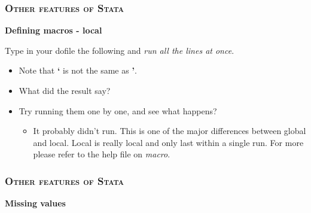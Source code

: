 \documentclass[10pt]{beamer}
\begin{document}
	\begin{frame}
	\frametitle{\textsc{Other features of Stata}}
		\begin{center}
			 \LARGE \textbf{Defining macros - local}
		\end{center}
		Type in your dofile the following and \textit{run all the lines at once}.
		\begin{itemize}
			\item Note that \textbf{`} is not the same as \textbf{'}.
\begin{stlog}\end{stlog}
		\vspace{2mm}
		 \item What did the result say?
		\onslide<3-> 
\begin{stlog}\end{stlog}
			 \item Try running them one by one, and see what happens?
				\begin{itemize}
					 \item It probably didn't run. 
									   This is one of the major differences between global and local.
									   Local is really local and only last within a single run.
									   For more please refer to the help file on \textit{macro}.
				\end{itemize}
		\end{itemize}
	\end{frame} 
	
	\begin{frame}
	\frametitle{\textsc{Other features of Stata}}
		\begin{center}
		\Large \textbf{Missing values}
		\end{center}
	\end{frame}
		
\end{document}
